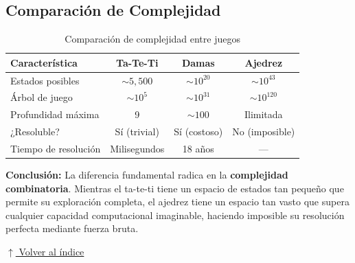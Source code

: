 \documentclass[12pt]{article}
\newcommand{\volverindice}{%
    \vspace{1em}%
    \begin{flushright}%
        \hyperlink{indice}{\small $\uparrow$ Volver al índice}%
    \end{flushright}%
}
\begin{document}
\subsection*{Comparación de Complejidad}

\begin{table}[H]
\centering
\begin{tabular}{@{}lccc@{}}
\toprule
\textbf{Característica} & \textbf{Ta-Te-Ti} & \textbf{Damas} & \textbf{Ajedrez} \\ 
\midrule
Estados posibles & $\sim 5{,}500$ & $\sim 10^{20}$ & $\sim 10^{43}$ \\
Árbol de juego & $\sim 10^5$ & $\sim 10^{31}$ & $\sim 10^{120}$ \\
Profundidad máxima & 9 & $\sim 100$ & Ilimitada \\
¿Resoluble? & Sí (trivial) & Sí (costoso) & No (imposible) \\
Tiempo de resolución & Milisegundos & 18 años & --- \\
\bottomrule
\end{tabular}
\caption{Comparación de complejidad entre juegos}
\end{table}

\textbf{Conclusión:} La diferencia fundamental radica en la \textbf{complejidad combinatoria}. Mientras el ta-te-ti tiene un espacio de estados tan pequeño que permite su exploración completa, el ajedrez tiene un espacio tan vasto que supera cualquier capacidad computacional imaginable, haciendo imposible su resolución perfecta mediante fuerza bruta.

\volverindice
\end{document}
